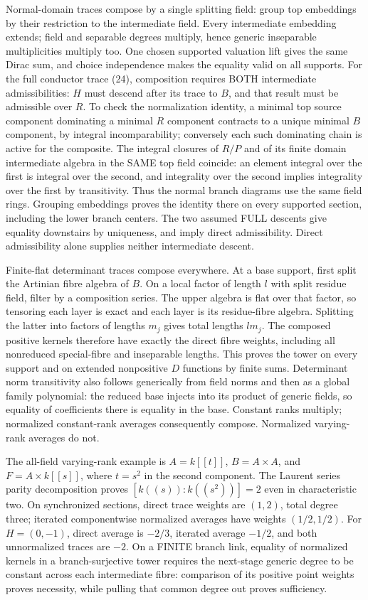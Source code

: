 \documentclass[11pt]{article}
\begin{document}
Normal-domain traces compose by a single splitting field: group top embeddings by their restriction to the intermediate field. Every intermediate embedding extends; field and separable degrees multiply, hence generic inseparable multiplicities multiply too. One chosen supported valuation lift gives the same Dirac sum, and choice independence makes the equality valid on all supports. For the full conductor trace (24), composition requires BOTH intermediate admissibilities: $H$ must descend after its trace to $B$, and that result must be admissible over $R$. To check the normalization identity, a minimal top source component dominating a minimal $R$ component contracts to a unique minimal $B$ component, by integral incomparability; conversely each such dominating chain is active for the composite. The integral closures of $R/P$ and of its finite domain intermediate algebra in the SAME top field coincide: an element integral over the first is integral over the second, and integrality over the second implies integrality over the first by transitivity. Thus the normal branch diagrams use the same field rings. Grouping embeddings proves the identity there on every supported section, including the lower branch centers. The two assumed FULL descents give equality downstairs by uniqueness, and imply direct admissibility. Direct admissibility alone supplies neither intermediate descent.

Finite-flat determinant traces compose everywhere. At a base support, first split the Artinian fibre algebra of $B$. On a local factor of length $l$ with split residue field, filter by a composition series. The upper algebra is flat over that factor, so tensoring each layer is exact and each layer is its residue-fibre algebra. Splitting the latter into factors of lengths $m_j$ gives total lengths $lm_j$. The composed positive kernels therefore have exactly the direct fibre weights, including all nonreduced special-fibre and inseparable lengths. This proves the tower on every support and on extended nonpositive $D$ functions by finite sums. Determinant norm transitivity also follows generically from field norms and then as a global family polynomial: the reduced base injects into its product of generic fields, so equality of coefficients there is equality in the base. Constant ranks multiply; normalized constant-rank averages consequently compose. Normalized varying-rank averages do not.

The all-field varying-rank example is $A=k[[t]]$, $B=A\times A$, and $F=A\times k[[s]]$, where $t=s^2$ in the second component. The Laurent series parity decomposition proves $[k((s)):k((s^2))]=2$ even in characteristic two. On synchronized sections, direct trace weights are $(1,2)$, total degree three; iterated componentwise normalized averages have weights $(1/2,1/2)$. For $H=(0,-1)$, direct average is $-2/3$, iterated average $-1/2$, and both unnormalized traces are $-2$. On a FINITE branch link, equality of normalized kernels in a branch-surjective tower requires the next-stage generic degree to be constant across each intermediate fibre: comparison of its positive point weights proves necessity, while pulling that common degree out proves sufficiency.
\end{document}
